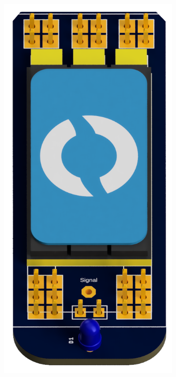 \begin{figure}[h]
\begin{subfigure}{0.15\columnwidth}
      \includegraphics[width=\textwidth]{Sections/2Design Rationale/images/ESC PCB.png}

\end{subfigure}
\end{figure}
